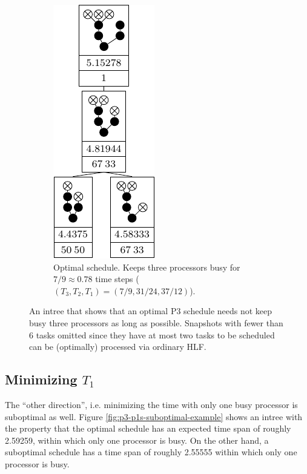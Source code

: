 \begin{figure}[ht]
\begin{subfigure}{.45\linewidth}
    \includegraphics{p3/keep_3_busy/three_busy_opt.pdf}
    \caption{Optimal schedule. Keeps three processors busy for $7/9\approx 0.78$ time steps ($(T_3, T_2, T_1)=(7/9, 31/24, 37/12)$).}
  \end{subfigure}
  \caption{An intree that shows that an optimal P3 schedule needs not keep busy three processors as long as possible. Snapshots with fewer than 6 tasks omitted since they have at most two tasks to be scheduled can be (optimally) processed via ordinary HLF.}
  \label{fig:p3-p3l-suboptimal-example}
\end{figure}

\subsection{Minimizing $T_1$}
\label{sec:p3-disproving-short-p1}

The ``other direction'', i.e. minimizing the time with only one busy processor is suboptimal as well.
Figure \ref{fig:p3-p1s-suboptimal-example} shows an intree with the property that the optimal schedule has an expected time span of roughly 2.59259, within which only one processor is busy. On the other hand, a suboptimal schedule has a time span of roughly 2.55555 within which only one processor is busy.

